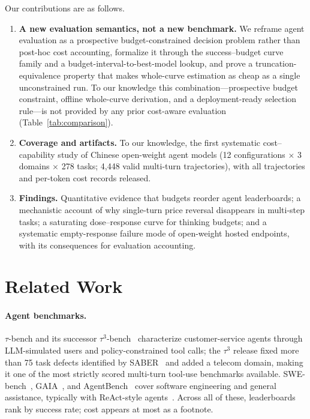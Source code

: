 \documentclass[preprint,authoryear,12pt]{elsarticle}
\begin{document}
Our contributions are as follows.
\begin{enumerate}
\item \textbf{A new evaluation semantics, not a new benchmark.} We reframe agent evaluation as a prospective budget-constrained decision problem rather than post-hoc cost accounting, formalize it through the success--budget curve family and a budget-interval-to-best-model lookup, and prove a truncation-equivalence property that makes whole-curve estimation as cheap as a single unconstrained run. To our knowledge this combination---prospective budget constraint, offline whole-curve derivation, and a deployment-ready selection rule---is not provided by any prior cost-aware evaluation (Table~\ref{tab:comparison}).
\item \textbf{Coverage and artifacts.} To our knowledge, the first systematic cost--capability study of Chinese open-weight agent models (12 configurations $\times$ 3 domains $\times$ 278 tasks; 4,448 valid multi-turn trajectories), with all trajectories and per-token cost records released.
\item \textbf{Findings.} Quantitative evidence that budgets reorder agent leaderboards; a mechanistic account of why single-turn price reversal disappears in multi-step tasks; a saturating dose--response curve for thinking budgets; and a systematic empty-response failure mode of open-weight hosted endpoints, with its consequences for evaluation accounting.
\end{enumerate}

\section{Related Work}
\label{sec:related-work}
\paragraph{Agent benchmarks.} $\tau$-bench and its successor $\tau^3$-bench~\cite{barres2025tau2bench} characterize customer-service agents through LLM-simulated users and policy-constrained tool calls; the $\tau^3$ release fixed more than 75 task defects identified by SABER~\cite{cuadron2025saber} and added a telecom domain, making it one of the most strictly scored multi-turn tool-use benchmarks available. SWE-bench~\cite{jimenez2024swebench}, GAIA~\cite{mialon2023gaia}, and AgentBench~\cite{liu2024agentbench} cover software engineering and general assistance, typically with ReAct-style agents~\cite{yao2023react}. Across all of these, leaderboards rank by success rate; cost appears at most as a footnote.
\end{document}
